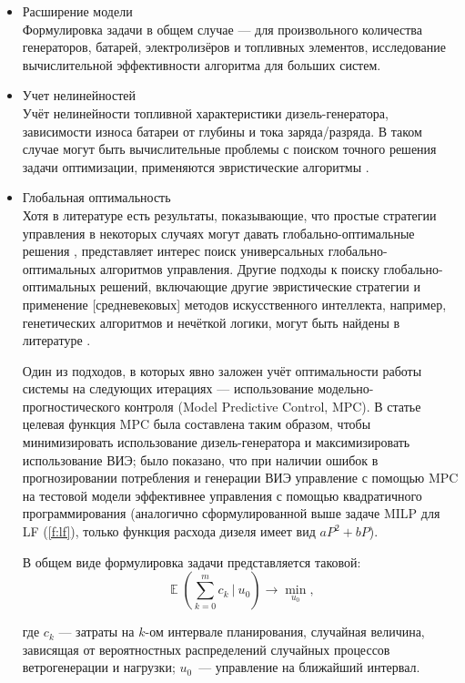 \documentclass{report}
\DeclareMathOperator*{\E}{\mathbb{E}}
\begin{document}
\begin{itemize}
    \item Расширение модели\\
    Формулировка задачи в общем случае --- для произвольного количества генераторов, батарей, электролизёров и топливных элементов, исследование вычислительной эффективности алгоритма для больших систем.

    \item Учет нелинейностей \\
    Учёт нелинейности топливной характеристики дизель-генератора,
    зависимости износа батареи от глубины и тока заряда/разряда.
    В таком случае могут быть вычислительные проблемы с поиском точного решения задачи оптимизации, применяются эвристические алгоритмы \cite{Sufyan2019}.
    
    \item Глобальная оптимальность\\
    Хотя в литературе есть результаты, показывающие, что простые стратегии управления в некоторых случаях могут давать глобально-оптимальные решения \cite{Barley1996}, представляет интерес поиск универсальных глобально-оптимальных алгоритмов управления.
    Другие подходы к поиску глобально-оптимальных решений, включающие другие эвристические стратегии и применение [средневековых] методов искусственного интеллекта, например, генетических алгоритмов и нечёткой логики, могут быть найдены в литературе \cite{Olatomiwa2016}.
    
    Один из подходов, в которых явно заложен учёт оптимальности работы системы на следующих итерациях --- использование модельно-прогностического контроля (Model Predictive Control, MPC).
    В статье \cite{Tazvinga2014} целевая функция MPC была составлена таким образом, чтобы минимизировать использование дизель-генератора и максимизировать использование ВИЭ; 
    было показано, что при наличии ошибок в прогнозировании потребления и генерации ВИЭ управление с помощью MPC на тестовой модели эффективнее управления с помощью квадратичного программирования (аналогично сформулированной выше задаче MILP для LF (\ref{f:lf}), только функция расхода дизеля имеет вид $aP^2 + bP$).
    
    
    В общем виде формулировка задачи представляется таковой:
    \begin{equation}
        \E\left( \sum_{k=0}^m c_k ~\vert~ u_0 \right) \rightarrow \min\limits_{u_0},
    \end{equation}
    
    где $c_k$ --- затраты на $k$-ом интервале планирования, случайная величина, зависящая от вероятностных распределений случайных процессов ветрогенерации и нагрузки; $u_0$~--- управление на ближайший интервал.
    

\end{itemize}
\end{document}
